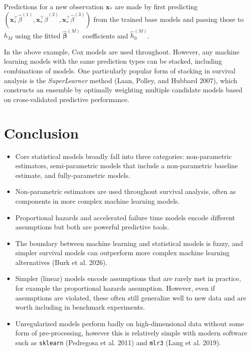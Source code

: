 \documentclass[
  letterpaper,
  krantz2]{style/krantz}
\providecommand{\tightlist}{%
  \setlength{\itemsep}{0pt}\setlength{\parskip}{0pt}}
\begin{document}
Predictions for a new observation \(\mathbf{x}_*\) are made by first
predicting
\((\mathbf{x}_*^\top\hat{\beta}^{(1)},\mathbf{x}_*^\top\hat{\beta}^{(2)},\mathbf{x}_*^\top\hat{\beta}^{(3)})\)
from the trained base models and passing those to \(h_M\) using the
fitted \(\hat{\boldsymbol{\beta}}^{(M)}\) coefficients and
\(\hat{h}^{(M)}_0\).

In the above example, Cox models are used throughout. However, any
machine learning models with the same prediction types can be stacked,
including combinations of models. One particularly popular form of
stacking in survival analysis is the \emph{SuperLearner} method (Laan,
Polley, and Hubbard 2007), which constructs an ensemble by optimally
weighting multiple candidate models based on cross-validated predictive
performance. 

\section{Conclusion}\label{conclusion-8}

\begin{tcolorbox}[enhanced jigsaw, toprule=.15mm, bottomtitle=1mm, opacityback=0, breakable, leftrule=.75mm, title={Key takeaways}, toptitle=1mm, bottomrule=.15mm, colback=white, colframe=quarto-callout-warning-color-frame, titlerule=0mm, opacitybacktitle=0.6, coltitle=black, rightrule=.15mm, left=2mm, colbacktitle=quarto-callout-warning-color!10!white, arc=.35mm]

\begin{itemize}
\tightlist
\item
  Core statistical models broadly fall into three categories:
  non-parametric estimators, semi-parametric models that include a
  non-parametric baseline estimate, and fully-parametric models.
\item
  Non-parametric estimators are used throughout survival analysis, often
  as components in more complex machine learning models.
\item
  Proportional hazards and accelerated failure time models encode
  different assumptions but both are powerful predictive tools.
\item
  The boundary between machine learning and statistical models is fuzzy,
  and simpler survival models can outperform more complex machine
  learning alternatives (Burk et al. 2026).
\item
  Simpler (linear) models encode assumptions that are rarely met in
  practice, for example the proportional hazards assumption. However,
  even if assumptions are violated, these often still generalize well to
  new data and are worth including in benchmark experiments.
\item
  Unregularized models perform badly on high-dimensional data without
  some form of pre-processing, however this is relatively simple with
  modern software such as \texttt{sklearn} (Pedregosa et al. 2011) and
  \texttt{mlr3} (Lang et al. 2019).
\end{itemize}

\end{tcolorbox}
\end{document}

